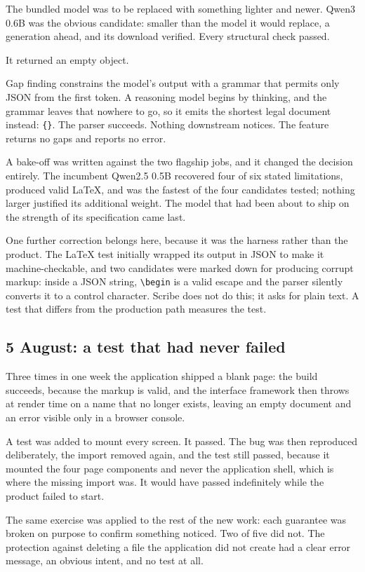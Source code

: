 \documentclass[11pt,a4paper]{article}
\begin{document}
The bundled model was to be replaced with something lighter and newer. Qwen3
0.6B was the obvious candidate: smaller than the model it would replace, a
generation ahead, and its download verified. Every structural check passed.

It returned an empty object.

Gap finding constrains the model's output with a grammar that permits only JSON
from the first token. A reasoning model begins by thinking, and the grammar
leaves that nowhere to go, so it emits the shortest legal document instead:
\texttt{\{\}}. The parser succeeds. Nothing downstream notices. The feature
returns no gaps and reports no error.

A bake-off was written against the two flagship jobs, and it changed the
decision entirely. The incumbent Qwen2.5 0.5B recovered four of six stated
limitations, produced valid LaTeX, and was the fastest of the four candidates
tested; nothing larger justified its additional weight. The model that had been
about to ship on the strength of its specification came last.

One further correction belongs here, because it was the harness rather than the
product. The LaTeX test initially wrapped its output in JSON to make it
machine-checkable, and two candidates were marked down for producing corrupt
markup: inside a JSON string, \verb|\begin| is a valid escape and the parser
silently converts it to a control character. Scribe does not do this; it asks
for plain text. A test that differs from the production path measures the test.

\subsection{5 August: a test that had never failed}

Three times in one week the application shipped a blank page: the build
succeeds, because the markup is valid, and the interface framework then throws
at render time on a name that no longer exists, leaving an empty document and
an error visible only in a browser console.

A test was added to mount every screen. It passed. The bug was then reproduced
deliberately, the import removed again, and the test still passed, because
it mounted the four page components and never the application shell, which is
where the missing import was. It would have passed indefinitely while the
product failed to start.

The same exercise was applied to the rest of the new work: each guarantee was
broken on purpose to confirm something noticed. Two of five did not. The
protection against deleting a file the application did not create had a clear
error message, an obvious intent, and no test at all.
\end{document}
